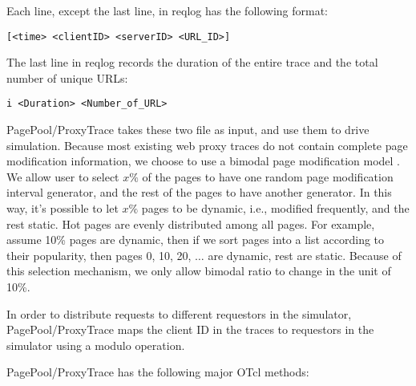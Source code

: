 Each line, except the last line, in reqlog has the following format:
\begin{center}
\begin{verbatim}
[<time> <clientID> <serverID> <URL_ID>]
\end{verbatim}
\end{center}

The last line in reqlog records the duration of the entire trace and
the total number of unique URLs:
\begin{center}
\begin{verbatim}
i <Duration> <Number_of_URL>
\end{verbatim}
\end{center}

PagePool/ProxyTrace takes these two file as input, and use them to
drive simulation. Because most existing web proxy traces do not
contain complete page modification information, we choose to use a
bimodal page modification model \cite{Cao97:CacheConsistency}. We
allow user to select $x\%$ of the pages to have one random page
modification interval generator, and the rest of the pages to have
another generator. In this way, it's possible to let $x\%$ pages to be
dynamic, i.e., modified frequently, and the rest static. Hot pages are
evenly distributed among all pages. For example, assume 10\% pages are
dynamic, then if we sort pages into a list according to their popularity,
then pages 0, 10, 20, $\ldots$ are dynamic, rest are static. Because
of this selection mechanism, we only allow bimodal ratio to change in
the unit of 10\%. 

In order to distribute requests to different requestors in the
simulator, PagePool/ProxyTrace maps the client ID in the traces to
requestors in the simulator using a modulo operation. 

PagePool/ProxyTrace has the following major OTcl methods:

